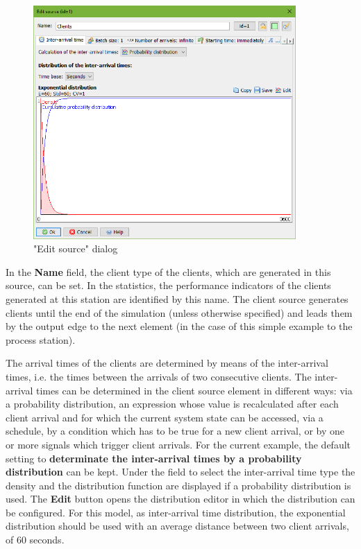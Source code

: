\documentclass{svmono}
\begin{document}
\begin{figure}[H]	
	\caption{"Edit source" dialog}
	\centerline{\includegraphics[width=10cm]{DialogSource.png}}
	\label{fig:DialogSource}
\end{figure}
 
In the \textbf{Name} field, the client type of the clients, which are generated in this source, can be set. In the statistics, the performance indicators of the clients generated at this station are identified by this name. The client source generates clients until the end of the simulation (unless otherwise specified) and leads them by the output edge to the next element (in the case of this simple example to the process station).

The arrival times of the clients are determined by means of the inter-arrival times, i.e. the times between the arrivals of two consecutive clients. The inter-arrival times can be determined in the client source element in different ways: via a probability distribution, an expression whose value is recalculated after each client arrival and for which the current system state can be accessed, via a schedule, by a condition which has to be true for a new client arrival, or by one or more signals which trigger client arrivals. For the current example, the default setting to \textbf{determinate the inter-arrival times by a probability distribution} can be kept. Under the field to select the inter-arrival time type the density and the distribution function are displayed if a probability distribution is used. The \textbf{Edit} button opens the distribution editor in which the distribution can be configured. For this model, as inter-arrival time distribution, the exponential distribution should be used with an average distance between two client arrivals, of 60 seconds.
\end{document}
